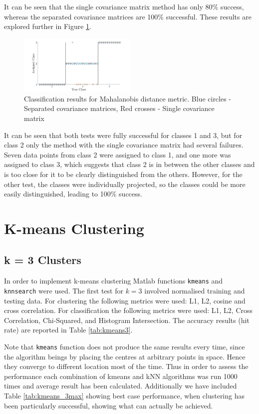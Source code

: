\documentclass[10pt,twocolumn,letterpaper]{article}
\begin{document}
It can be seen that the single covariance matrix method has only 80\% success, whereas the separated covariance matrices are 100\% successful. These results are explored further in Figure \ref{fig:Mahal}.

\begin{figure}[H]
\centering
\includegraphics[width=0.5\textwidth]{../results/Q1Db_Success}
\caption{Classification results for Mahalanobis distance metric. Blue circles - Separated covariance matrices, Red crosses - Single covariance matrix
\label{fig:Mahal}}
\end{figure}

It can be seen that both tests were fully successful for classes 1 and 3, but for class 2 only the method with the single covariance matrix had several failures. Seven data points from class 2 were assigned to class 1, and one more was assigned to class 3, which suggests that class 2 is in between the other classes and is too close for it to be clearly distinguished from the others. However, for the other test, the classes were individually projected, so the classes could be more easily distinguished, leading to 100\% success.

\section{K-means Clustering}
\subsection{k = 3 Clusters}
In order to implement k-means clustering Matlab functions {\tt\small kmeans} and {\tt\small knnsearch} were used. The first test for $k=3$ involved normalised training and testing data. For clustering the following metrics were used: L1, L2, cosine and cross correlation.
For classification the following metrics were used: L1, L2, Cross Correlation, Chi-Squared, and Histogram Intersection. The accuracy results (hit rate) are reported in Table \ref{tab:kmeans3}.

Note that {\tt\small kmeans} function does not produce the same results every time, since the algorithm beings by placing the centres at arbitrary points in space. Hence they converge to different location most of the time. Thus in order to assess the performance each combination of kmeans and kNN algorithms was run 1000 times and average result has been calculated. Additionally we have included Table \ref{tab:kmeans_3max} showing best case performance, when clustering has been particularly successful, showing what can actually be achieved.
\end{document}
